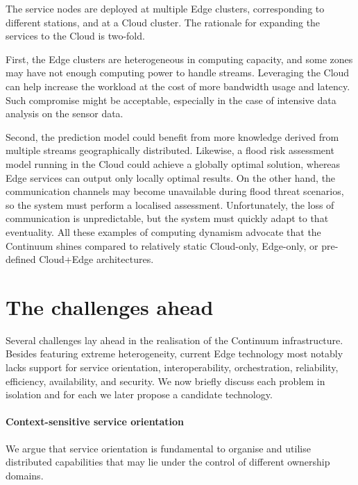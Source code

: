 The service nodes are deployed at multiple Edge clusters, corresponding to different stations, and at a Cloud cluster. The rationale for expanding the services to the Cloud is two-fold.

First, the Edge clusters are heterogeneous in computing capacity, and some zones may have not enough computing power to handle streams. Leveraging the Cloud can help increase the workload at the cost of more bandwidth usage and latency. Such compromise might be acceptable, especially in the case of intensive data analysis on the sensor data.

Second, the prediction model could benefit from more knowledge derived from multiple streams geographically distributed. Likewise, a flood risk assessment model running in the Cloud could achieve a globally optimal solution, whereas Edge services can output only locally optimal results. On the other hand, the communication channels may become unavailable during flood threat scenarios, so the system must perform a localised assessment. Unfortunately, the loss of communication is unpredictable, but the system must quickly adapt to that eventuality. All these examples of computing dynamism advocate that the Continuum shines compared to relatively static Cloud-only, Edge-only, or pre-defined Cloud+Edge architectures.

\section{The challenges ahead}
\label{sec:challenges}

Several challenges lay ahead in the realisation of the Continuum infrastructure. Besides featuring extreme heterogeneity, current Edge technology most notably lacks support for service orientation, interoperability, orchestration, reliability, efficiency, availability, and security. We now briefly discuss each problem in isolation and for each we later propose a candidate technology.

\paragraph{Context-sensitive service orientation}
We argue that service orientation is fundamental to organise and utilise distributed capabilities that may lie under the control of different ownership domains. 

